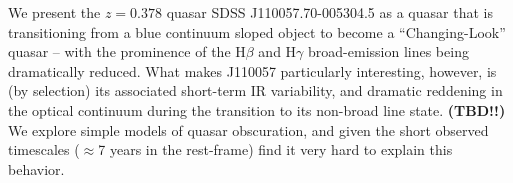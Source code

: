 We present the $z=0.378$ quasar SDSS J110057.70-005304.5 as a quasar
that is transitioning from a blue continuum sloped object to become a
``Changing-Look'' quasar -- with the prominence of the H$\beta$ and
H$\gamma$ broad-emission lines being dramatically reduced. What makes
J110057 particularly interesting, however, is (by selection) its
associated short-term IR variability, and dramatic reddening in the
optical continuum during the transition to its non-broad line state.
{\bf (TBD!!)} We explore simple models of quasar obscuration, and
given the short observed timescales ($\approx$7 years in the rest-frame) 
find it very hard to explain this behavior.
